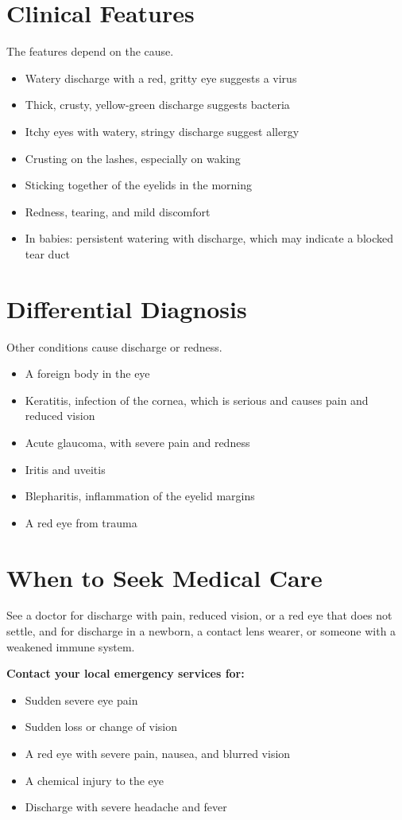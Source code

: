 \section*{Clinical Features}
The features depend on the cause.
\begin{itemize}
    \item Watery discharge with a red, gritty eye suggests a virus
    \item Thick, crusty, yellow-green discharge suggests bacteria
    \item Itchy eyes with watery, stringy discharge suggest allergy
    \item Crusting on the lashes, especially on waking
    \item Sticking together of the eyelids in the morning
    \item Redness, tearing, and mild discomfort
    \item In babies: persistent watering with discharge, which may indicate a blocked tear duct
\end{itemize}

\section*{Differential Diagnosis}
Other conditions cause discharge or redness.
\begin{itemize}
    \item A foreign body in the eye
    \item Keratitis, infection of the cornea, which is serious and causes pain and reduced vision
    \item Acute glaucoma, with severe pain and redness
    \item Iritis and uveitis
    \item Blepharitis, inflammation of the eyelid margins
    \item A red eye from trauma
\end{itemize}

\section*{When to Seek Medical Care}
See a doctor for discharge with pain, reduced vision, or a red eye that does not settle, and for discharge in a newborn, a contact lens wearer, or someone with a weakened immune system.

\textbf{Contact your local emergency services for:}
\begin{itemize}
    \item Sudden severe eye pain
    \item Sudden loss or change of vision
    \item A red eye with severe pain, nausea, and blurred vision
    \item A chemical injury to the eye
    \item Discharge with severe headache and fever
\end{itemize}

